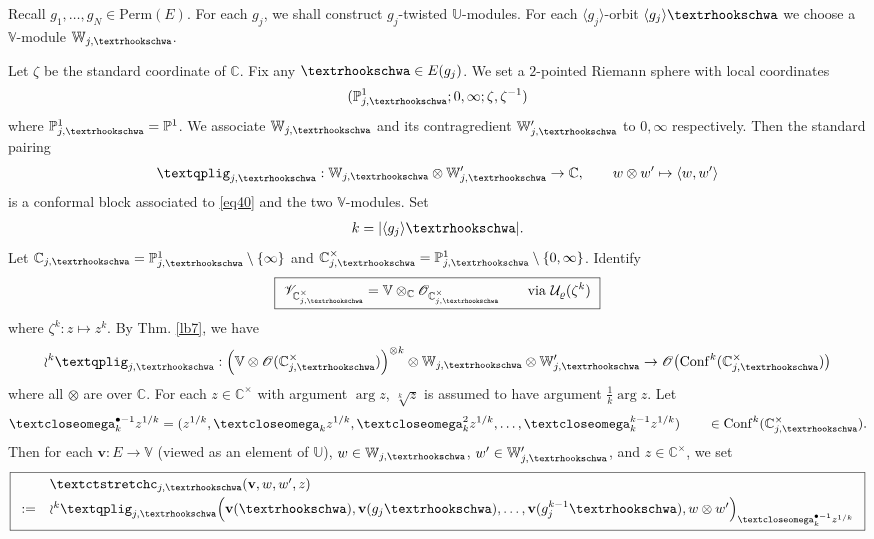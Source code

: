 \documentclass[11pt,b5paper,notitlepage]{article}
\theoremstyle{definition}
\theoremstyle{plain}
\newcommand{\mc}{\mathcal}
\newcommand{\Conf}{\mathrm{Conf}}
\newcommand{\bk}[1]{\langle {#1}\rangle}
\newcommand{\scr}{\mathscr}
\newcommand{\mbb}{\mathbb}
\newcommand{\blt}{\bullet}
\newcommand{\Vbb}{\mathbb V}
\newcommand{\Ubb}{\mathbb U}
\newcommand{\Wbb}{\mathbb W}
\newcommand{\Cbb}{\mathbb C}
\newcommand{\Pbb}{\mathbb P}
\newcommand{\vbf}{\mathbf v}
\newcommand{\Perm}{\mathrm{Perm}}
\newcommand{\tipaomega}{\text{\textcloseomega}}
\newcommand{\tipae}{\text{\textrhookschwa}}
\newcommand{\tipxcc}{\text{\textctstretchc}}
\newcommand{\tipxphi}{\text{\textqplig}}
\numberwithin{equation}{subsection}
\begin{document}
Recall $g_1,\dots,g_N\in\Perm(E)$. For each $g_j$, we shall construct $g_j$-twisted $\mbb U$-modules. For each $\bk{g_j}$-orbit $\bk{g_j}\tipae$ we choose a $\Vbb$-module $\Wbb_{j,\tipae}$.

Let $\zeta$ be the standard coordinate of $\Cbb$. Fix any $\tipae\in E(g_j)$. We set a $2$-pointed Riemann sphere with local coordinates
\begin{align}
(\Pbb^1_{j,\tipae};0,\infty;\zeta,\zeta^{-1})	\label{eq40}
\end{align}
where $\Pbb^1_{j,\tipae}=\Pbb^1$. We associate $\Wbb_{j,\tipae}$ and its contragredient  $\Wbb_{j,\tipae}'$ to $0,\infty$ respectively. Then the standard pairing \index{zz@$\tipxphi_{j,\tipae}$}
\begin{gather}
\tipxphi_{j,\tipae}:	\Wbb_{j,\tipae}\otimes \Wbb_{j,\tipae}'\rightarrow\Cbb, \qquad w\otimes w'\mapsto \bk{w,w'}\label{eq33}
\end{gather}
is a conformal block associated to \eqref{eq40} and the two $\Vbb$-modules. Set
\begin{align}
{k}=|\bk{g_j}\tipae|.	
\end{align}
Let $\Cbb_{j,\tipae}=\Pbb_{j,\tipae}^1\setminus\{\infty\}$ and $\Cbb_{j,\tipae}^\times=\Pbb_{j,\tipae}^1\setminus\{0,\infty\}$. Identify
\begin{align}
\boxed{~\scr V_{\Cbb^\times_{j,\tipae}}=\Vbb\otimes_\Cbb\scr O_{\Cbb^\times_{j,\tipae}}\qquad \text{via }\mc U_\varrho(\zeta^{{k}})~}\label{eq35}
\end{align}
where $\zeta^k:z\mapsto z^k$. By Thm. \ref{lb7}, we have
\begin{align*}
\wr^{{k}}\tipxphi_{j,\tipae}:\Big(\Vbb\otimes\scr O(\Cbb_{j,\tipae}^\times)\Big)^{\otimes {k}}\otimes \Wbb_{j,\tipae}\otimes \Wbb_{j,\tipae}'\rightarrow\scr O\big(\Conf^{{k}}(\Cbb_{j,\tipae}^\times)\big)
\end{align*}
where all $\otimes$ are over $\Cbb$. For each $z\in\Cbb^\times$ with argument $\arg z$,  $\sqrt[k]z$ is assumed to have argument $\frac 1k\arg z$. Let \index{zz@$\tipaomega_k^{\blt-1}z^{1/k}$}
\begin{align*}
\tipaomega_k^{\blt-1}z^{1/k}=(z^{1/k},\tipaomega_kz^{1/k},\tipaomega_k^2z^{1/k},\dots,\tipaomega_k^{k-1}z^{1/k})	\qquad\in\Conf^k(\Cbb^\times_{j,\tipae}).
\end{align*}
Then for each $\vbf:E\rightarrow \Vbb$ (viewed as an element of $\Ubb$), $w\in \Wbb_{j,\tipae}$, $w'\in \Wbb_{j,\tipae}'$, and $z\in\Cbb^\times$, we set \index{zz@$\tipxcc_{j,\tipae}$}
\begin{align}
\boxed{\begin{array}{rl}
&\tipxcc_{j,\tipae}(\vbf,w,w',z)\\[0.7ex]
:=&	\wr^{{k}}\tipxphi_{j,\tipae}\Big(\vbf(\tipae),\vbf(g_j\tipae),\dots,\vbf(g_j^{{k}-1}\tipae), w\otimes w'\Big)_{\tipaomega_{{k}}^{\blt-1}z^{1/{k}}}
\end{array}}	\label{eq29}
\end{align}
\end{document}

